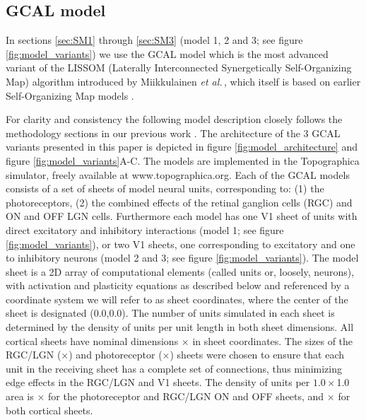 \documentclass[utf8]{frontiersSCNS}
\newcommand{\etal}{\textit{et al.}}
\begin{document}
\subsection{GCAL model}\label{sec:gcal}

In sections \ref{sec:SM1} through \ref{sec:SM3} (model 1, 2 and 3; see figure \ref{fig:model_variants}) we use the GCAL model \citep{Stevens2013}  which is the most advanced variant of the LISSOM (Laterally Interconnected Synergetically Self-Organizing Map) algorithm introduced by Miikkulainen \etal\,\citep{CMVC}, which itself is based on earlier Self-Organizing Map models \citep{Kohonen1982}.

For clarity and consistency the following model description closely follows the methodology sections in our 
previous work \citep{Stevens2013,Antolik2011}. The architecture of the 3 GCAL variants presented in this 
paper is depicted in figure \ref{fig:model_architecture} and figure \ref{fig:model_variants}A-C. The models are implemented in the Topographica simulator, freely available at www.topographica.org. 
Each of the GCAL models consists of a set of sheets of model neural units, corresponding to: (1) the photoreceptors, (2) the combined effects of the retinal ganglion cells (RGC) and ON and OFF LGN cells. Furthermore each model has one V1 sheet of units with direct excitatory and inhibitory interactions (model 1; see figure \ref{fig:model_variants}), or two 
V1 sheets, one corresponding to excitatory and one to inhibitory neurons (model 2 and 3; see figure \ref{fig:model_variants}).
The model sheet is a 2D array of computational elements (called units or, loosely, neurons), with activation and plasticity equations as 
described below and referenced by a coordinate system we will refer to as sheet coordinates, where the center of the sheet is designated (0.0,0.0).  
The number of units simulated in each sheet is determined by the density of units per unit length in both sheet dimensions. 
All cortical sheets have nominal dimensions $\times$ in sheet coordinates. The sizes of the
RGC/LGN ($\times$) and photoreceptor ($\times$) sheets
were chosen to ensure that each unit in the receiving sheet has a complete set of connections, thus minimizing edge effects in the
RGC/LGN and V1 sheets. The density of units per $1.0\times$1.0 area is $\times$ 
for the photoreceptor and RGC/LGN ON and OFF sheets, and $\times$ for both cortical sheets.
\end{document}
